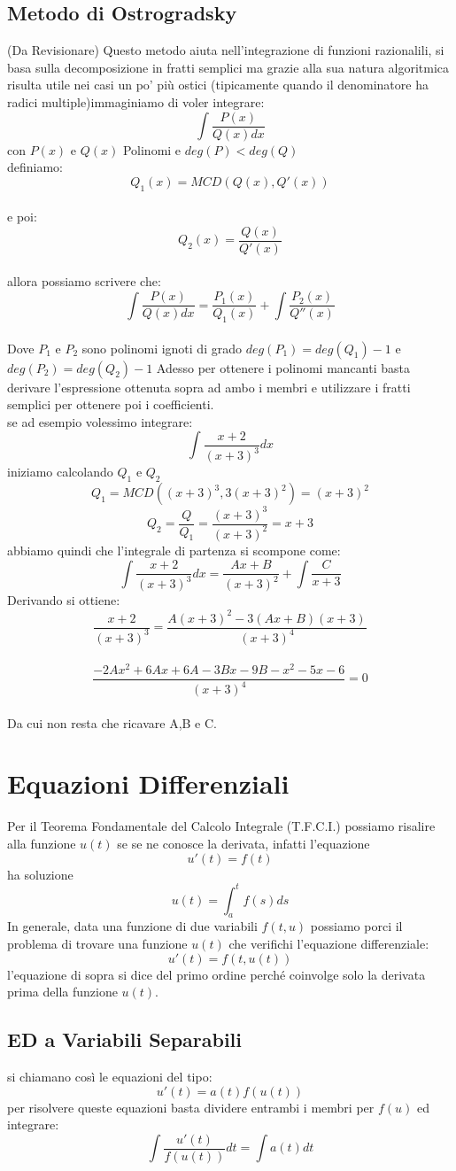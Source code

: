 \documentclass[a4paper,twoside]{article}
\theoremstyle{definition}
\numberwithin{theorem}{section}
\begin{document}
\subsection{Metodo di Ostrogradsky}
(Da Revisionare)
Questo metodo aiuta nell'integrazione di funzioni razionalili, si basa sulla decomposizione in fratti semplici ma grazie alla sua natura algoritmica risulta utile nei casi un po' più ostici (tipicamente quando il denominatore ha radici multiple)immaginiamo di voler integrare:
$$\int\frac{P(x)}{Q(x)dx}$$
con $P(x)$ e $Q(x)$ Polinomi e $deg(P)<deg(Q)$ \\

definiamo: $$Q_1(x)=MCD(Q(x),Q'(x))$$ \\
e poi:
$$Q_2(x)=\frac{Q(x)}{Q'(x)}$$ \\
allora possiamo scrivere che:
$$\int\frac{P(x)}{Q(x)dx}=\frac{P_1(x)}{Q_1(x)}+\int\frac{P_2(x)}{Q''(x)}$$ \\
Dove $P_1$ e $P_2$ sono polinomi ignoti di grado $deg(P_1)=deg(Q_1)-1$ e $deg(P_2)=deg(Q_2)-1$
Adesso per ottenere i polinomi mancanti basta derivare l'espressione ottenuta sopra ad ambo i membri e utilizzare i fratti semplici per ottenere poi i coefficienti. \\
se ad esempio volessimo integrare:
$$\int\frac{x+2}{(x+3)^3}dx$$
iniziamo calcolando $Q_1$ e $Q_2$
$$Q_1=MCD((x+3)^3, 3(x+3)^2)=(x+3)^2$$  $$Q_2=\frac{Q}{Q_1}=\frac{(x+3)^3}{(x+3)^2}=x+3$$
abbiamo quindi che l'integrale di partenza si scompone come:
$$\int\frac{x+2}{(x+3)^3}dx =\frac{Ax+B}{(x+3)^2} + \int\frac{C}{x+3}$$
Derivando si ottiene:
$$\frac{x+2}{(x+3)^3}=\frac{A(x+3)^2-3(Ax+B)(x+3)}{(x+3)^4} $$ \\
$$\frac{-2Ax^2+6Ax+6A-3Bx-9B-x^2-5x-6}{(x+3)^4}=0$$
\\
Da cui non resta che ricavare A,B e C.
\section{Equazioni Differenziali}
Per il Teorema Fondamentale del Calcolo Integrale (T.F.C.I.) possiamo risalire alla funzione $u(t)$ se se ne conosce la derivata, infatti l'equazione $$u'(t)=f(t)$$ ha soluzione $$u(t)=\int_{a}^{t}f(s)ds$$
In generale, data una funzione di due variabili $f(t,u)$ possiamo porci il problema di trovare una funzione $u(t)$ che verifichi l'equazione differenziale:$$u'(t)=f(t,u(t))$$
l'equazione di sopra si dice del primo ordine perché coinvolge solo la derivata prima della funzione $u(t)$.
\subsection{ED a Variabili Separabili}
si chiamano così le equazioni del tipo: $$u'(t)=a(t)f(u(t))$$ per risolvere queste equazioni basta dividere entrambi i membri per $f(u)$ ed integrare: $$\int\frac{u'(t)}{f(u(t))}dt=\int a(t)dt$$
\end{document}
